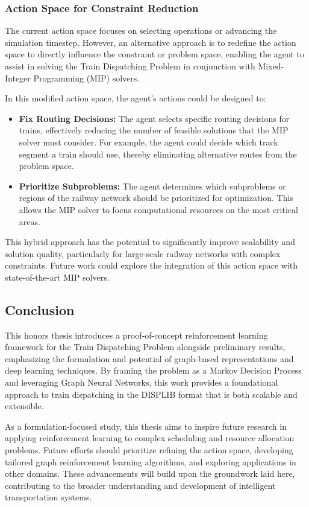 \documentclass[runningheads]{llncs}
\begin{document}
\subsubsection{Action Space for Constraint Reduction}
The current action space focuses on selecting operations or advancing the simulation timestep. 
However, an alternative approach is to redefine the action space to directly influence the constraint or problem space, enabling the agent to assist in solving the Train Dispatching Problem in conjunction with Mixed-Integer Programming (MIP) solvers.

In this modified action space, the agent's actions could be designed to:
\begin{itemize}
    \item \textbf{Fix Routing Decisions:} The agent selects specific routing decisions for trains, effectively reducing the number of feasible solutions that the MIP solver must consider. For example, the agent could decide which track segment a train should use, thereby eliminating alternative routes from the problem space.
    \item \textbf{Prioritize Subproblems:} The agent determines which subproblems or regions of the railway network should be prioritized for optimization. This allows the MIP solver to focus computational resources on the most critical areas.
\end{itemize}

This hybrid approach has the potential to significantly improve scalability and solution quality, particularly for large-scale railway networks with complex constraints. 
Future work could explore the integration of this action space with state-of-the-art MIP solvers.

\subsection{Conclusion}
\label{sss:conclusion}

This honors thesis introduces a proof-of-concept reinforcement learning framework for the Train Dispatching Problem alongside preliminary results, emphasizing the formulation and potential of graph-based representations and deep learning techniques. 
By framing the problem as a Markov Decision Process and leveraging Graph Neural Networks, this work provides a foundational approach to train dispatching in the DISPLIB format that is both scalable and extensible.

As a formulation-focused study, this thesis aims to inspire future research in applying reinforcement learning to complex scheduling and resource allocation problems. 
Future efforts should prioritize refining the action space, developing tailored graph reinforcement learning algorithms, and exploring applications in other domains. 
These advancements will build upon the groundwork laid here, contributing to the broader understanding and development of intelligent transportation systems.
\end{document}
